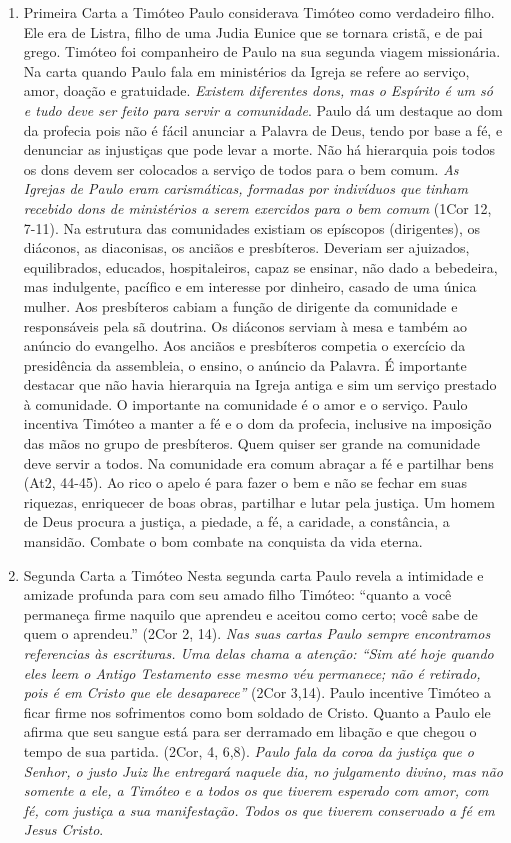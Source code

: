 \documentclass[
]{book}
\begin{document}
\begin{enumerate}
\def\labelenumi{\arabic{enumi}.}
\item
  Primeira Carta a Timóteo
  Paulo considerava Timóteo como verdadeiro filho. Ele era de Listra, filho de uma Judia Eunice que se tornara cristã, e de pai grego. Timóteo foi companheiro de Paulo na sua segunda viagem missionária. Na carta quando Paulo fala em ministérios da Igreja se refere ao serviço, amor, doação e gratuidade. \emph{Existem diferentes dons, mas o Espírito é um só e tudo deve ser feito para servir a comunidade}. Paulo dá um destaque ao dom da profecia pois não é fácil anunciar a Palavra de Deus, tendo por base a fé, e denunciar as injustiças que pode levar a morte. Não há hierarquia pois todos os dons devem ser colocados a serviço de todos para o bem comum. \emph{As Igrejas de Paulo eram carismáticas, formadas por indivíduos que tinham recebido dons de ministérios a serem exercidos para o bem comum} (1Cor 12, 7-11).
  Na estrutura das comunidades existiam os epíscopos (dirigentes), os diáconos, as diaconisas, os anciãos e presbíteros. Deveriam ser ajuizados, equilibrados, educados, hospitaleiros, capaz se ensinar, não dado a bebedeira, mas indulgente, pacífico e em interesse por dinheiro, casado de uma única mulher. Aos presbíteros cabiam a função de dirigente da comunidade e responsáveis pela sã doutrina. Os diáconos serviam à mesa e também ao anúncio do evangelho. Aos anciãos e presbíteros competia o exercício da presidência da assembleia, o ensino, o anúncio da Palavra. É importante destacar que não havia hierarquia na Igreja antiga e sim um serviço prestado à comunidade. O importante na comunidade é o amor e o serviço. Paulo incentiva Timóteo a manter a fé e o dom da profecia, inclusive na imposição das mãos no grupo de presbíteros. Quem quiser ser grande na comunidade deve servir a todos. Na comunidade era comum abraçar a fé e partilhar bens (At2, 44-45). Ao rico o apelo é para fazer o bem e não se fechar em suas riquezas, enriquecer de boas obras, partilhar e lutar pela justiça. Um homem de Deus procura a justiça, a piedade, a fé, a caridade, a constância, a mansidão. Combate o bom combate na conquista da vida eterna.
\item
  Segunda Carta a Timóteo
  Nesta segunda carta Paulo revela a intimidade e amizade profunda para com seu amado filho Timóteo: ``quanto a você permaneça firme naquilo que aprendeu e aceitou como certo; você sabe de quem o aprendeu.'' (2Cor 2, 14). \emph{Nas suas cartas Paulo sempre encontramos referencias às escrituras. Uma delas chama a atenção: ``Sim até hoje quando eles leem o Antigo Testamento esse mesmo véu permanece; não é retirado, pois é em Cristo que ele desaparece''} (2Cor 3,14). Paulo incentive Timóteo a ficar firme nos sofrimentos como bom soldado de Cristo. Quanto a Paulo ele afirma que seu sangue está para ser derramado em libação e que chegou o tempo de sua partida. (2Cor, 4, 6,8). \emph{Paulo fala da coroa da justiça que o Senhor, o justo Juiz lhe entregará naquele dia, no julgamento divino, mas não somente a ele, a Timóteo e a todos os que tiverem esperado com amor, com fé, com justiça a sua manifestação. Todos os que tiverem conservado a fé em Jesus Cristo}.

\end{enumerate}
\end{document}
